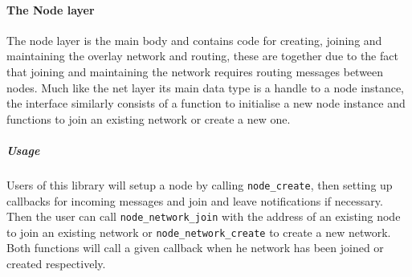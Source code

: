 \documentclass{article}
\begin{document}
\paragraph{The Node layer}
The node layer is the main body and contains code for creating, joining and maintaining the overlay network  and routing, these are together due to the fact that joining and maintaining the network requires routing messages between nodes. Much like the net layer its main data type is a handle to a node instance, the interface similarly consists of a function to initialise a new node instance and functions to join an existing network or create a new one. 


\subparagraph{Usage}
Users of this library will setup a node by calling \texttt{node\_create}, then setting up callbacks for incoming messages and join and leave notifications if necessary.
\\
Then the user can call \texttt{node\_network\_join} with the address of an existing node to join an existing network or \texttt{node\_network\_create} to create a new network. Both functions will call a given callback when he network has been joined or created respectively.
\end{document}
